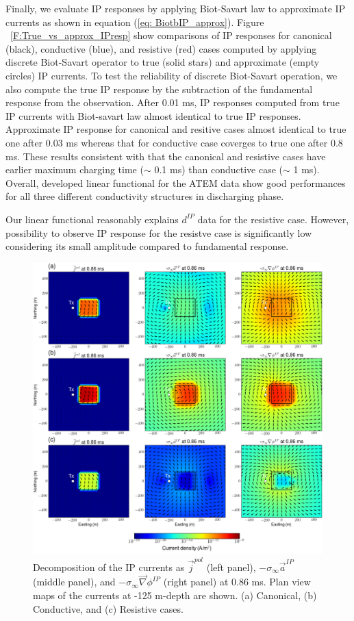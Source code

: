 \documentclass[a4paper, 11pt]{article}
\newcommand{\grad}{\vec \nabla}
\newcommand{\siginf}{\sigma_\infty}
\renewcommand {\j}  { {\vec j} }
\newcommand{\dip}{d^{IP}}
\begin{document}
Finally, we evaluate IP responses by applying Biot-Savart law to approximate IP currents as shown in equation (\ref{eq: BiotbIP_approx}). 
Figure ~\ref{F:True_vs_approx_IPresp} show comparisons of IP responses for canonical (black), conductive (blue), and resistive (red) cases computed by applying discrete Biot-Savart operator to true (solid stars) and approximate (empty circles) IP currents. 
To test the reliability of discrete Biot-Savart operation, we also compute the true IP response by the subtraction of the fundamental response from the observation.
After 0.01 ms, IP responses computed from true IP currents with Biot-savart law almost identical to true IP responses.
Approximate IP response for canonical and resitive cases almost identical to true one after 0.03 ms whereas that for conductive case coverges to true one after 0.8 ms. 
These results consistent with that the canonical and resistive cases have earlier maximum charging time ($\sim$ 0.1 ms) than conductive case ($\sim$ 1 ms).
Overall, developed linear functional for the ATEM data show good performances for all three different conductivity structures in discharging phase. 

Our linear functional reasonably explains $\dip$ data for the resistive case. However, possibility to observe IP response for the resistve case is significantly low considering its small amplitude compared to fundamental response. 

\begin{figure}[htb]
  \centering
  \includegraphics[width=1.\textwidth]{figures/IPcurrents_helmholtz_early.png}
  \caption{Decomposition of the IP currents as $\j^{pol}$ (left panel), $-\siginf\vec{a}^{IP}$ (middle panel), and $-\siginf\grad \phi^{IP}$ (right panel) at 0.86 ms. Plan view maps of the currents at -125 m-depth are shown. (a) Canonical, (b) Conductive, and (c) Resistive cases. }
  \label{F:IPcurrents_helmholtz_early}
\end{figure}
\end{document}

